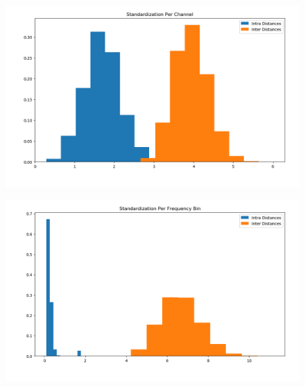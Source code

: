 \begin{figure}[hbt!]
	\centering
		\includegraphics[width=1\textwidth]
		{Bilder/std_channel.png}
		\label{fig:Label1.4.3}
\end{figure}



\begin{figure}[hbt!]
	\centering
		\includegraphics[width=1\textwidth]
		{Bilder/std_freq_bin.png}
		\label{fig:Label1.4.4}
\end{figure}

 \clearpage